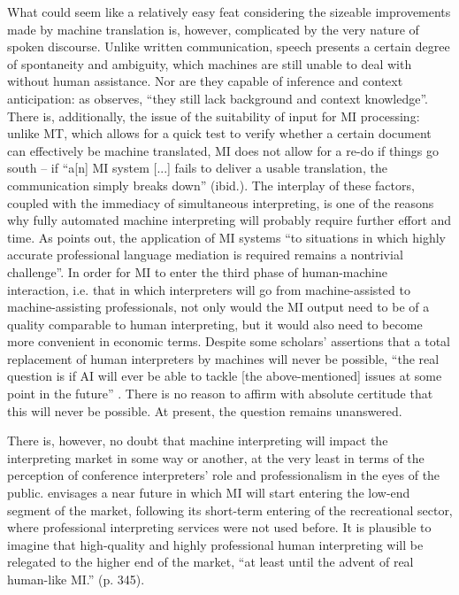 What could seem like a relatively easy feat considering the sizeable improvements made by machine translation is, however, complicated by the very nature of spoken discourse. Unlike written communication, speech presents a certain degree of spontaneity and ambiguity, which machines are still unable to deal with without human assistance. Nor are they capable of inference and context anticipation: as \citet[342]{fantinuoli_technological_2019} observes, ``they still lack background and context knowledge''. There is, additionally, the issue of the suitability of input for MI processing: unlike MT, which allows for a quick test to verify whether a certain document can effectively be machine translated, MI does not allow for a re-do if things go south – if ``a[n] MI system [...] fails to deliver a usable translation, the communication simply breaks down'' (ibid.). The interplay of these factors, coupled with the immediacy of simultaneous interpreting, is one of the reasons why fully automated machine interpreting will probably require further effort and time. As \citet[295]{braun_technology_2020} points out, the application of MI systems ``to situations in which highly accurate professional language mediation is required remains a nontrivial challenge''. In order for MI to enter the third phase of human-machine interaction, i.e. that in which interpreters will go from machine-assisted to machine-assisting professionals, not only would the MI output need to be of a quality comparable to human interpreting, but it would also need to become more convenient in economic terms. Despite some scholars' assertions that a total replacement of human interpreters by machines will never be possible, ``the real question is if AI will ever be able to tackle [the above-mentioned] issues at some point in the future'' \citep[345]{fantinuoli_technological_2019}. There is no reason to affirm with absolute certitude that this will never be possible. At present, the question remains unanswered.

There is, however, no doubt that machine interpreting will impact the interpreting market in some way or another, at the very least in terms of the perception of conference interpreters' role and professionalism in the eyes of the public. \citet{fantinuoli_technological_2019} envisages a near future in which MI will start entering the low-end segment of the market, following its short-term entering of the recreational sector, where professional interpreting services were not used before. It is plausible to imagine that high-quality and highly professional human interpreting will be relegated to the higher end of the market, ``at least until the advent of real human-like MI.'' (p. 345).


